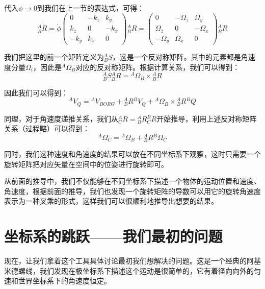 代入$\phi\rightarrow 0$到我们在上一节的表达式，可得：
\[{}^A_B \dot{R} = \dot{\phi}\begin{pmatrix}
    0 & -k_z & k_y\\
    k_z & 0 & -k_x\\
    -k_y & k_x & 0
\end{pmatrix}{}^A_B R
= \begin{pmatrix}
    0 & -\Omega_z & \Omega_y\\
    \Omega_z & 0 & -\Omega_x\\
    -\Omega_y & \Omega_x & 0
\end{pmatrix}{}^A_B R
\]

我们把这里的前一个矩阵定义为${}^A_B S$，这是一个反对称矩阵。其中的元素都是角速度分量$\Omega_i$，因此是${}^A \Omega_B$对应的反对称矩阵。根据计算关系，我们可以得到：
\[{}^A_B S {}^A_B R = {}^A \Omega_B\times {}^A_B R\]

因此我们可以得到：
\[{}^A V_Q = {}^A V_{BORG} + {}^A_B R {}^B V_Q + {}^A\Omega_B\times {}^A_B R {}^B Q\]

同理，对于角速度递推关系，我们从${}^A_C R = {}^A_B R{}^B_C R$开始推导，利用上述反对称矩阵关系（过程略）可以得到：
\[{}^A \Omega_C = {}^A\Omega_B + {}^A_B R {}^B \Omega_C\]

同时，我们这种速度和角速度的结果可以放在不同坐标系下观察，这时只需要一个旋转矩阵把对应矢量在空间中的位姿进行旋转即可。

从前面的推导中，我们不仅能够在不同坐标系下描述一个物体的运动位置和速度、角速度，根据前面的推导，我们也发现一个旋转矩阵的导数可以用它的旋转角速度表示为一种叉乘的形式，这样我们可以很顺利地推导出想要的结果。


\section{坐标系的跳跃——我们最初的问题}
现在，让我们拿着这个工具具体讨论最初我们想解决的问题。这是一个经典的阿基米德螺线，我们发现在极坐标系下描述这个运动是很简单的，它有着径向向外的匀速和世界坐标系下的角速度恒定。

